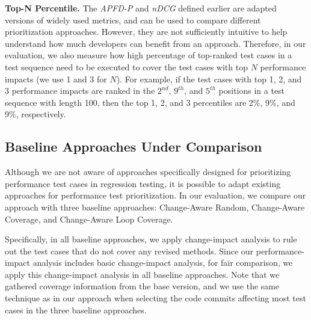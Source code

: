 



\textbf{Top-N Percentile.} The \textit{APFD-P} and \textit{nDCG} defined earlier are adapted versions of widely used metrics, and can be used to compare different prioritization approaches. However, they are not sufficiently intuitive to help understand how much developers can benefit from an approach. Therefore, in our evaluation, we also measure how high percentage of top-ranked test cases in a test sequence need to be executed to cover the test cases with top $N$ performance impacts (we use 1 and 3 for $N$). For example, if the test cases with top 1, 2, and 3 performance impacts are ranked in the $2^{nd}$, $9^{th}$, and $5^{th}$ positions in a test sequence with length 100, then the top 1, 2, and 3 percentiles are 2\%, 9\%, and 9\%, respectively. 

\subsection{Baseline Approaches Under Comparison}

Although we are not aware of approaches specifically designed for prioritizing performance test cases in regression testing, it is possible to adapt existing approaches for performance test prioritization. In our evaluation, we compare our approach with three baseline approaches: Change-Aware Random, Change-Aware Coverage, and Change-Aware Loop Coverage.

Specifically, in all baseline approaches, we apply change-impact analysis to rule out the test cases that do not cover any revised methods. Since our performance-impact analysis includes basic change-impact analysis, for fair comparison, we apply this change-impact analysis in all baseline approaches. Note that we gathered coverage information from the base version, and we use the same technique as in our approach when selecting the code commits affecting most test cases in the three baseline approaches. 

